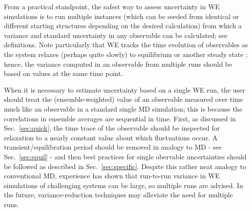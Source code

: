 From a practical standpoint, the safest way to assess uncertainty in WE simulations is to run multiple instances (which can be seeded from identical or different starting structures depending on the desired calculation) from which a variance and standard uncertainty in any observable can be calculated; see definitions.
Note particularly that WE tracks the time evolution of observables as the system relaxes (perhaps quite slowly) to equilibrium or another steady state \cite{Zhang2010a}; hence, the variance computed in an observable from multiple runs should be based on values at the same time point.

When it is necessary to estimate uncertainty based on a single WE run, the user should treat the (ensemble-weighted) value of an observable measured over time much like an observable in a standard single MD simulation; this is because the correlations in ensemble averages are sequential in time.
First, as discussed in Sec.\ \ref{sec:quick}, the time trace of the observable should be inspected for relaxation to a nearly constant value about which fluctuations occur.
A transient/equilibration period should be removed in analogy to MD - see Sec.\ \ref{sec:equil} - and then best practices for single obervable uncertainties should be followed as described in Sec.\ \ref{sec:specific}.
Despite this rather neat analogy to conventional MD, experience has shown that run-to-run variance in WE simulations of challenging systems can be  large, so multiple runs are  advised.  In the future, variance-reduction techniques may alleviate the need for multiple runs.

